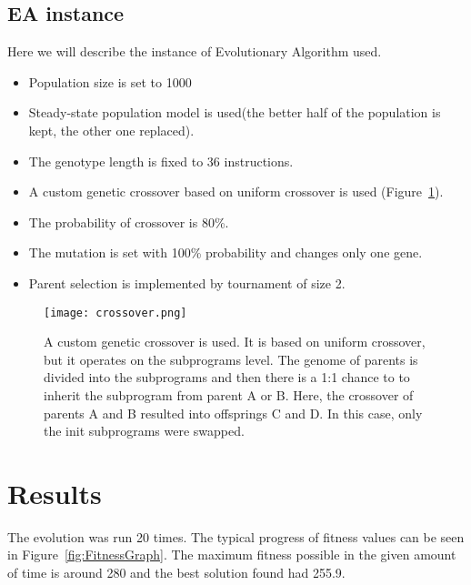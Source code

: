 \documentclass{ExcelAtFIT}
\begin{document}
\subsection{EA instance}
\label{sec:Experiment}
Here we will describe the instance of Evolutionary Algorithm used.
\begin{itemize}
	\item Population size is set to 1000
	\item Steady-state population model is used(the better half of the population is kept, the other one replaced).
	\item The genotype length is fixed to 36 instructions.
	\item A custom genetic crossover based on uniform crossover is used (Figure~\ref{fig:Crossover}).
	\item The probability of crossover is 80\%.
	\item The mutation is set with 100\% probability and changes only one gene.
	\item Parent selection is implemented by tournament of size 2.
\end{itemize}

\begin{figure}[t]
	\centering
	{\texttt{[image: crossover.png]}}
	\caption{
	A custom genetic crossover is used.
	It is based on uniform crossover, but it operates on the subprograms level.
	The genome of parents is divided into the subprograms and then there is a 1:1 chance to to inherit the subprogram from parent A or B.
	Here, the crossover of parents A and B resulted into offsprings C and D.
	In this case, only the init subprograms were swapped.
	}
	\label{fig:Crossover}
\end{figure}




\section{Results}
The evolution was run 20 times.
The typical progress of fitness values can be seen in Figure~\ref{fig:FitnessGraph}.
The maximum fitness possible in the given amount of time is around 280 and the best solution found had 255.9.
\end{document}
